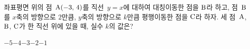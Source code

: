 좌표평면 위의 점~$\mathrm{A}(-3,\mkern3mu 4)$를 직선~$y=x$에 대하여 대칭이동한 점을 $\mathrm{B}$라 하고, 점~$\mathrm{B}$를 $x$축의 방향으로 $2$만큼, $y$축의 방향으로 $k$만큼 평행이동한 점을 $\mathrm{C}$라 하자. 세 점~$\mathrm{A}$, $\mathrm{B}$, $\mathrm{C}$가 한 직선 위에 있을 때, 실수 $k$의 값은?
\begin{choices32}{$-5$}{$-4$}{$-3$}{$-2$}{$-1$}\end{choices32}
